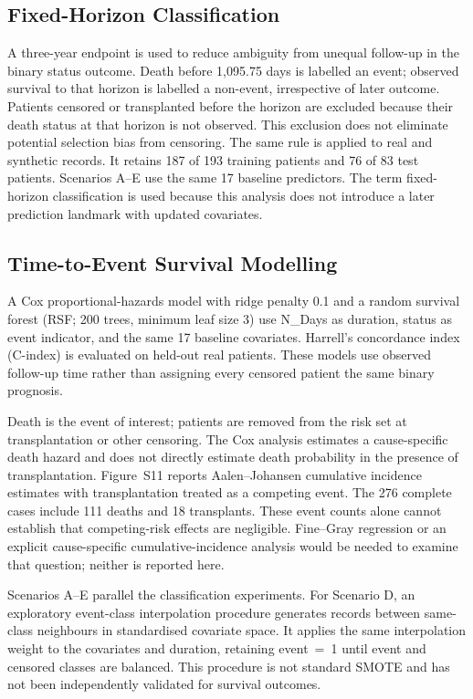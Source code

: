 \documentclass[journal]{IEEEtran}
\begin{document}
\subsection{Fixed-Horizon Classification}
\label{sec:landmark}

A three-year endpoint is used to reduce ambiguity from unequal follow-up in the binary status outcome. Death before 1,095.75 days is labelled an event; observed survival to that horizon is labelled a non-event, irrespective of later outcome. Patients censored or transplanted before the horizon are excluded because their death status at that horizon is not observed. This exclusion does not eliminate potential selection bias from censoring. The same rule is applied to real and synthetic records. It retains 187 of 193 training patients and 76 of 83 test patients. Scenarios A--E use the same 17 baseline predictors. The term fixed-horizon classification is used because this analysis does not introduce a later prediction landmark with updated covariates.

\subsection{Time-to-Event Survival Modelling}
\label{sec:survival}

A Cox proportional-hazards model with ridge penalty 0.1 and a random survival forest (RSF; 200 trees, minimum leaf size 3) use N\_Days as duration, status as event indicator, and the same 17 baseline covariates. Harrell's concordance index (C-index) is evaluated on held-out real patients. These models use observed follow-up time rather than assigning every censored patient the same binary prognosis.

Death is the event of interest; patients are removed from the risk set at transplantation or other censoring. The Cox analysis estimates a cause-specific death hazard and does not directly estimate death probability in the presence of transplantation. Figure~S11 reports Aalen--Johansen cumulative incidence estimates with transplantation treated as a competing event. The 276 complete cases include 111 deaths and 18 transplants. These event counts alone cannot establish that competing-risk effects are negligible. Fine--Gray regression or an explicit cause-specific cumulative-incidence analysis would be needed to examine that question; neither is reported here.

Scenarios A--E parallel the classification experiments. For Scenario D, an exploratory event-class interpolation procedure generates records between same-class neighbours in standardised covariate space. It applies the same interpolation weight to the covariates and duration, retaining event~=~1 until event and censored classes are balanced. This procedure is not standard SMOTE and has not been independently validated for survival outcomes.
\end{document}
